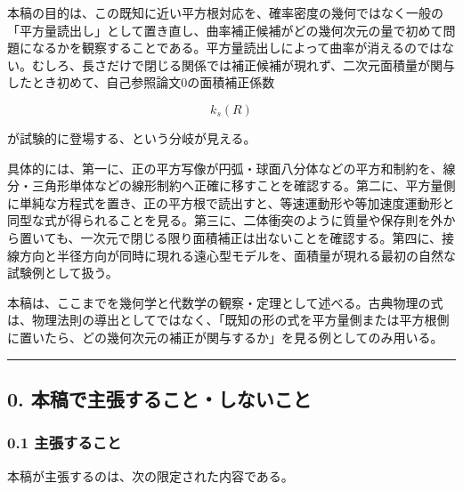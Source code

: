 \documentclass[
]{ltjsarticle}
\begin{document}
本稿の目的は、この既知に近い平方根対応を、確率密度の幾何ではなく一般の「平方量読出し」として置き直し、曲率補正候補がどの幾何次元の量で初めて問題になるかを観察することである。平方量読出しによって曲率が消えるのではない。むしろ、長さだけで閉じる関係では補正候補が現れず、二次元面積量が関与したとき初めて、自己参照論文0の面積補正係数

\[
k_s(R)
\]

が試験的に登場する、という分岐が見える。

具体的には、第一に、正の平方写像が円弧・球面八分体などの平方和制約を、線分・三角形単体などの線形制約へ正確に移すことを確認する。第二に、平方量側に単純な方程式を置き、正の平方根で読出すと、等速運動形や等加速度運動形と同型な式が得られることを見る。第三に、二体衝突のように質量や保存則を外から置いても、一次元で閉じる限り面積補正は出ないことを確認する。第四に、接線方向と半径方向が同時に現れる遠心型モデルを、面積量が現れる最初の自然な試験例として扱う。

本稿は、ここまでを幾何学と代数学の観察・定理として述べる。古典物理の式は、物理法則の導出としてではなく、「既知の形の式を平方量側または平方根側に置いたら、どの幾何次元の補正が関与するか」を見る例としてのみ用いる。

\begin{center}\rule{0.5\linewidth}{0.5pt}\end{center}

\subsection{0.
本稿で主張すること・しないこと}\label{ux672cux7a3fux3067ux4e3bux5f35ux3059ux308bux3053ux3068ux3057ux306aux3044ux3053ux3068}

\subsubsection{0.1
主張すること}\label{ux4e3bux5f35ux3059ux308bux3053ux3068}

本稿が主張するのは、次の限定された内容である。
\end{document}
